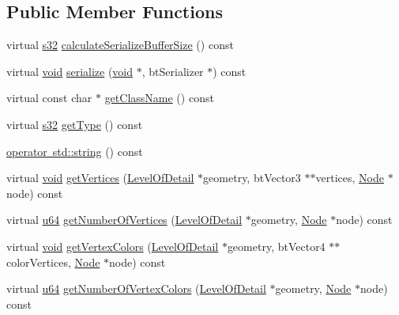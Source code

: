\subsection*{Public Member Functions}
\begin{DoxyCompactItemize}
\item 
virtual \mbox{\hyperlink{_util_8h_aa62c75d314a0d1f37f79c4b73b2292e2}{s32}} \mbox{\hyperlink{classnjli_1_1_plane_a7f585c76d7bd568c089c91c12cba4982}{calculate\+Serialize\+Buffer\+Size}} () const
\item 
virtual \mbox{\hyperlink{_thread_8h_af1e856da2e658414cb2456cb6f7ebc66}{void}} \mbox{\hyperlink{classnjli_1_1_plane_a3a3dd9c8e6f4a7a8304732b80c1ce68f}{serialize}} (\mbox{\hyperlink{_thread_8h_af1e856da2e658414cb2456cb6f7ebc66}{void}} $\ast$, bt\+Serializer $\ast$) const
\item 
virtual const char $\ast$ \mbox{\hyperlink{classnjli_1_1_plane_a9a7ccbc86c1f486cd816f0f4f3e9c550}{get\+Class\+Name}} () const
\item 
virtual \mbox{\hyperlink{_util_8h_aa62c75d314a0d1f37f79c4b73b2292e2}{s32}} \mbox{\hyperlink{classnjli_1_1_plane_ae2a4d392bb3fe4ad2aa068a578aa11d7}{get\+Type}} () const
\item 
\mbox{\hyperlink{classnjli_1_1_plane_a0530fd624d0fbb1b2629f74e81a8b0fa}{operator std\+::string}} () const
\item 
virtual \mbox{\hyperlink{_thread_8h_af1e856da2e658414cb2456cb6f7ebc66}{void}} \mbox{\hyperlink{classnjli_1_1_plane_ad021359d2f67ae8165be5b14c33b4b6d}{get\+Vertices}} (\mbox{\hyperlink{classnjli_1_1_level_of_detail}{Level\+Of\+Detail}} $\ast$geometry, bt\+Vector3 $\ast$$\ast$vertices, \mbox{\hyperlink{classnjli_1_1_node}{Node}} $\ast$node) const
\item 
virtual \mbox{\hyperlink{_util_8h_ad758b7a5c3f18ed79d2fcd23d9f16357}{u64}} \mbox{\hyperlink{classnjli_1_1_plane_a6e25a6d9b9819d375c257b68a1e8a6d6}{get\+Number\+Of\+Vertices}} (\mbox{\hyperlink{classnjli_1_1_level_of_detail}{Level\+Of\+Detail}} $\ast$geometry, \mbox{\hyperlink{classnjli_1_1_node}{Node}} $\ast$node) const
\item 
virtual \mbox{\hyperlink{_thread_8h_af1e856da2e658414cb2456cb6f7ebc66}{void}} \mbox{\hyperlink{classnjli_1_1_plane_ada514395abc636326f76aee6fba5ab4f}{get\+Vertex\+Colors}} (\mbox{\hyperlink{classnjli_1_1_level_of_detail}{Level\+Of\+Detail}} $\ast$geometry, bt\+Vector4 $\ast$$\ast$color\+Vertices, \mbox{\hyperlink{classnjli_1_1_node}{Node}} $\ast$node) const
\item 
virtual \mbox{\hyperlink{_util_8h_ad758b7a5c3f18ed79d2fcd23d9f16357}{u64}} \mbox{\hyperlink{classnjli_1_1_plane_ad003f2734ae681dc704bac77d7e7ca89}{get\+Number\+Of\+Vertex\+Colors}} (\mbox{\hyperlink{classnjli_1_1_level_of_detail}{Level\+Of\+Detail}} $\ast$geometry, \mbox{\hyperlink{classnjli_1_1_node}{Node}} $\ast$node) const

\end{DoxyCompactItemize}
